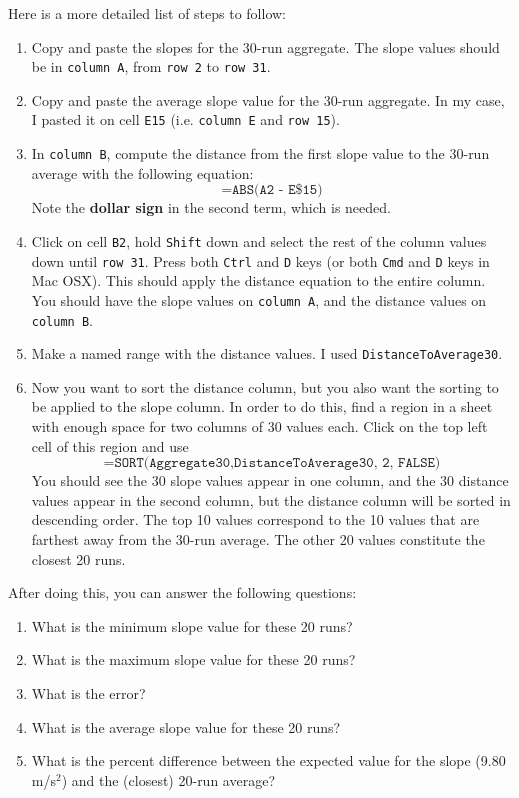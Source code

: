 Here is a more detailed list of steps to follow:
\begin{enumerate}
    \item Copy and paste the slopes for the 30-run aggregate. The slope values should be in \texttt{column A}, from \texttt{row 2} to \texttt{row 31}.
    \item Copy and paste the average slope value for the 30-run aggregate. In my case, I pasted it on cell \texttt{E15} (i.e. \texttt{column E} and \texttt{row 15}).
    \item In \texttt{column B}, compute the distance from the first slope value to the 30-run average with the following equation:
    \begin{equation}
        \texttt{=ABS(A2 - E\$15)}
    \end{equation}
    Note the \textbf{dollar sign} in the second term, which is needed.
    \item Click on cell \texttt{B2}, hold \texttt{Shift} down and select the rest of the column values down until \texttt{row 31}. Press both \texttt{Ctrl} and \texttt{D} keys (or both \texttt{Cmd} and \texttt{D} keys in Mac OSX). This should apply the distance equation to the entire column. You should have the slope values on \texttt{column A}, and the distance values on \texttt{column B}.
    \item Make a named range with the distance values. I used \texttt{DistanceToAverage30}.
    \item Now you want to sort the distance column, but you also want the sorting to be applied to the slope column. In order to do this, find a region in a sheet with enough space for two columns of 30 values each. Click on the top left cell of this region and use
    \begin{equation}
        \texttt{=SORT({Aggregate30,DistanceToAverage30}, 2, FALSE)}
    \end{equation}
    You should see the 30 slope values appear in one column, and the 30 distance values appear in the second column, but the distance column will be sorted in descending order. The top 10 values correspond to the 10 values that are farthest away from the 30-run average. The other 20 values constitute the closest 20 runs.
\end{enumerate}
After doing this, you can answer the following questions:
\begin{enumerate}
    \item What is the minimum slope value for these 20 runs?
    \item What is the maximum slope value for these 20 runs?
    \item What is the error?
    \item What is the average slope value for these 20 runs?
    \item What is the percent difference between the expected value for the slope (9.80 m/s$^{2}$) and the (closest) 20-run average?
\end{enumerate}
